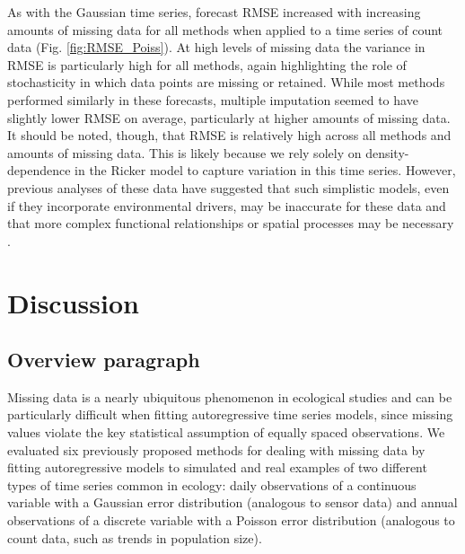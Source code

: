 \documentclass{article}
\begin{document}
\begin{linenumbers}
As with the Gaussian time series, forecast RMSE increased with increasing amounts of missing data for all methods when applied to a time series of count data (Fig. \ref{fig:RMSE_Poiss}). At high levels of missing data the variance in RMSE is particularly high for all methods, again highlighting the role of stochasticity in which data points are missing or retained. While most methods performed similarly in these forecasts, multiple imputation seemed to have slightly lower RMSE on average, particularly at higher amounts of missing data. It should be noted, though, that RMSE is relatively high across all methods and amounts of missing data. This is likely because we rely solely on density-dependence in the Ricker model to capture variation in this time series. However, previous analyses of these data have suggested that such simplistic models, even if they incorporate environmental drivers, may be inaccurate for these data and that more complex functional relationships or spatial processes may be necessary \citep{lebreton1990modelling}.


\section*{Discussion}

\subsection*{Overview paragraph}

 Missing data is a nearly ubiquitous phenomenon in ecological studies and can be particularly difficult when fitting autoregressive time series models, since missing values violate the key statistical assumption of equally spaced observations. We evaluated six previously proposed methods for dealing with missing data by fitting autoregressive models to simulated and real examples of two different types of time series common in ecology: daily observations of a continuous variable with a Gaussian error distribution (analogous to sensor data) and annual observations of a discrete variable with a Poisson error distribution (analogous to count data, such as trends in population size). 
 

\end{linenumbers}
\end{document}
